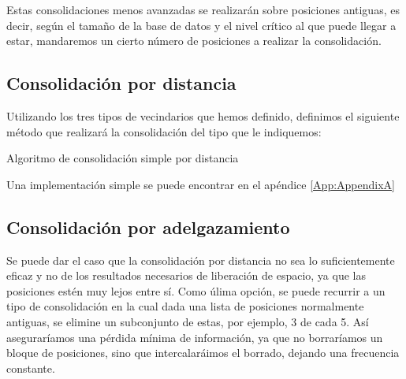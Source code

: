 \documentclass[a4paper, 12pt]{article}
\begin{document}
Estas consolidaciones menos avanzadas se realizar\'an sobre posiciones antiguas, es decir, seg\'un el tama\~no de la base de datos y el nivel cr\'itico al que puede llegar a estar, mandaremos un cierto n\'umero de posiciones a realizar la consolidaci\'on. \\


\pagebreak
\subsection{Consolidaci\'on por distancia}

Utilizando los tres tipos de vecindarios que hemos definido, definimos el siguiente m\'etodo que realizar\'a la consolidaci\'on del tipo que le indiquemos:\\


\begin{algorithm}[h]\label{consolidationByDistance}
\begin{algorithmic}[1]
        \Else
        \EndIf
    \EndIf
        \Else
        \EndIf
    \EndIf
        \Else
        \EndIf
    \EndIf
\EndFor
\EndFunction
\end{algorithmic}
\caption{\label{alg:consolidationByDinstace} Algoritmo de consolidaci\'on simple por distancia}
\end{algorithm}

Una implementaci\'on simple se puede encontrar en el ap\'endice \ref{App:AppendixA}
\pagebreak
\subsection{Consolidaci\'on por adelgazamiento}

Se puede dar el caso que la consolidaci\'on por distancia no sea lo suficientemente eficaz y no de los resultados necesarios de liberaci\'on de espacio, ya que las posiciones est\'en muy lejos entre s\'i. Como \'ulima opci\'on, se puede recurrir a un tipo de consolidaci\'on en la cual dada una lista de posiciones normalmente antiguas, se elimine un subconjunto de estas, por ejemplo, 3 de cada 5. As\'i asegurar\'iamos una p\'erdida m\'inima de informaci\'on, ya que no borrar\'iamos un bloque de posiciones, sino que intercalar\'aimos el borrado, dejando una frecuencia constante. \\
\end{document}

